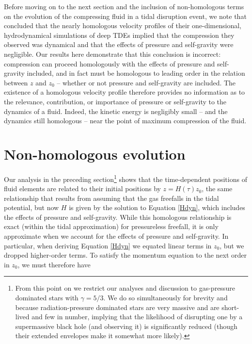 \documentclass[twocolumn]{aastex62}
\begin{document}
Before moving on to the next section and the inclusion of non-homologous terms on the evolution of the compressing fluid in a tidal disruption event, we note that \citet{brassart08} concluded that the nearly homologous velocity profiles of their one-dimensional, hydrodynamical simulations of deep TDEs implied that the compression they observed was dynamical and that the effects of pressure and self-gravity were negligible. Our results here demonstrate that this conclusion is incorrect: compression can proceed homologously with the effects of pressure and self-gravity included, and in fact must be homologous to leading order in the relation between $z$ and $z_0$ -- whether or not pressure and self-gravity are included. The existence of a homologous velocity profile therefore provides no information as to the relevance, contribution, or importance of pressure or self-gravity to the dynamics of a fluid. Indeed, the kinetic energy is negligibly small -- and the dynamics still homologous -- near the point of maximum compression of the fluid. %

\newpage
\section{Non-homologous evolution}
\label{sec:non-homologous}
Our analysis in the preceding section\footnote{From this point on we restrict our analyses and discussion to gas-pressure dominated stars with $\gamma = 5/3$. We do so simultaneously for brevity and because radiation-pressure dominated stars are very massive and are short-lived and few in number, implying that the likelihood of disrupting one by a supermassive black hole (and observing it) is significantly reduced (though their extended envelopes make it somewhat more likely).} shows that the time-dependent positions of fluid elements are related to their initial positions by $z = H(\tau)z_0$, the same relationship that results from assuming that the gas freefalls in the tidal potential, but now $H$ is given by the solution to Equation \eqref{Hdyn}, which includes the effects of pressure and self-gravity. While this homologous relationship is exact (within the tidal approximation) for pressureless freefall, {it is only approximate} when we account for the effects of pressure and self-gravity. 
In particular, when deriving Equation \eqref{Hdyn} we equated linear terms in $z_0$, but we dropped higher-order terms. To satisfy the momentum equation to the next order in $z_0$, we must therefore have
\end{document}
